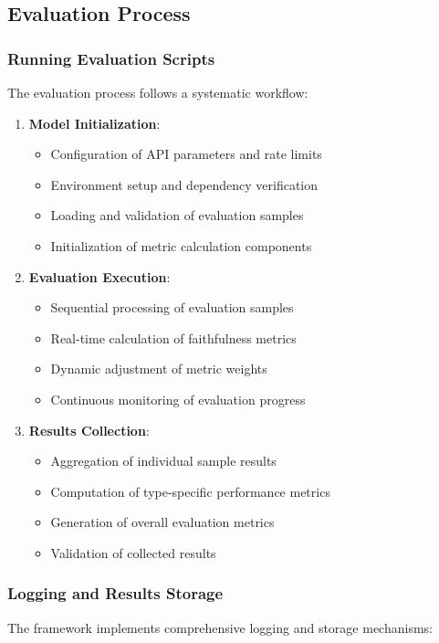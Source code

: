 \subsection{Evaluation Process}

\subsubsection{Running Evaluation Scripts}
The evaluation process follows a systematic workflow:
\begin{enumerate}
    \item \textbf{Model Initialization}:
    \begin{itemize}
        \item Configuration of API parameters and rate limits
        \item Environment setup and dependency verification
        \item Loading and validation of evaluation samples
        \item Initialization of metric calculation components
    \end{itemize}

    \item \textbf{Evaluation Execution}:
    \begin{itemize}
        \item Sequential processing of evaluation samples
        \item Real-time calculation of faithfulness metrics
        \item Dynamic adjustment of metric weights
        \item Continuous monitoring of evaluation progress
    \end{itemize}

    \item \textbf{Results Collection}:
    \begin{itemize}
        \item Aggregation of individual sample results
        \item Computation of type-specific performance metrics
        \item Generation of overall evaluation metrics
        \item Validation of collected results
    \end{itemize}
\end{enumerate}

\subsubsection{Logging and Results Storage}
The framework implements comprehensive logging and storage mechanisms:

